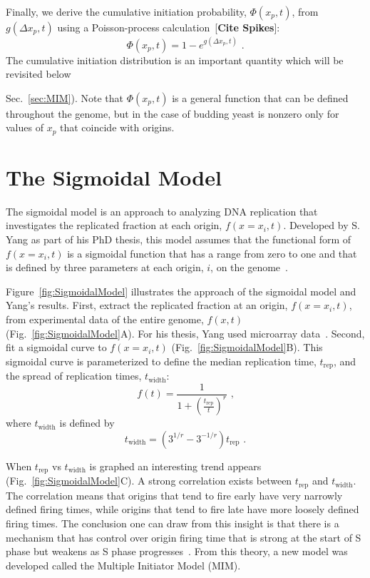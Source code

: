 		Finally, we derive the cumulative initiation probability, $\Phi(x_p,t)$, from $g(\Delta x_p,t)$ using a Poisson-process calculation~[\textbf{Cite Spikes}]:
		\begin{equation} \label{eq:PhiFromG}
			\Phi\left( x_p,t\right) = 1 - e^{g\left(\Delta x_p,t\right)} \text{ .}
		\end{equation}
		The cumulative initiation distribution is an important quantity which will be revisited below {Sec.~\ref{sec:MIM}).
		Note that $\Phi(x_p,t)$ is a general function that can be defined throughout the genome, but in the case of budding yeast is nonzero only for values of $x_p$ that coincide with origins.


	\section{The Sigmoidal Model}
	\label{sec:SigmoidalModel}
	
	The sigmoidal model is an approach to analyzing DNA replication that investigates the replicated fraction at each origin, $f(x=x_i,t)$.
	Developed by S. Yang as part of his PhD thesis, this model assumes that the functional form of $f(x=x_i,t)$ is a sigmoidal function that has a range from zero to one and that is defined by three parameters at each origin, $i$, on the genome~\cite{ScottsPaper,ScottsThesis}.
	
	Figure~\ref{fig:SigmoidalModel} illustrates the approach of the sigmoidal model and Yang's results.
	First, extract the replicated fraction at an origin, $f(x=x_i,t)$, from experimental data of the entire genome, $f(x,t)$ (Fig.~\ref{fig:SigmoidalModel}A).
	For his thesis, Yang used microarray data~\cite{McCuneMicroArray}.
	Second, fit a sigmoidal curve to $f(x=x_i,t)$ (Fig.~\ref{fig:SigmoidalModel}B).
	This sigmoidal curve is parameterized to define the median replication time, $t_{\text{rep}}$, and the spread of replication times, $t_{\text{width}}$:
	\begin{equation} \label{eq:SigmoidalModel}
		f(t) = {\frac{1}{1+\left({\frac{t_{\text{rep}}}{t}}\right)^r}}\text{ ,}
	\end{equation}
	where $t_{\text{width}}$ is defined by
	\begin{equation}
		t_{\text{width}} = \left(3^{1/r}-3^{-1/r}\right)t_{\text{rep}}\text{ .}
	\end{equation}
	
	When $t_{\text{rep}}$ vs $t_{\text{width}}$ is graphed an interesting trend appears (Fig.~\ref{fig:SigmoidalModel}C).
	A strong correlation exists between $t_{\text{rep}}$ and $t_{\text{width}}$.
	The correlation means that origins that tend to fire early have very narrowly defined firing times, while origins that tend to fire late have more loosely defined firing times.
	The conclusion one can draw from this insight is that there is a mechanism that has control over origin firing time that is strong at the start of S phase but weakens as S phase progresses~\cite{ScottsThesis}.
	From this theory, a new model was developed called the Multiple Initiator Model (MIM).
	
}
